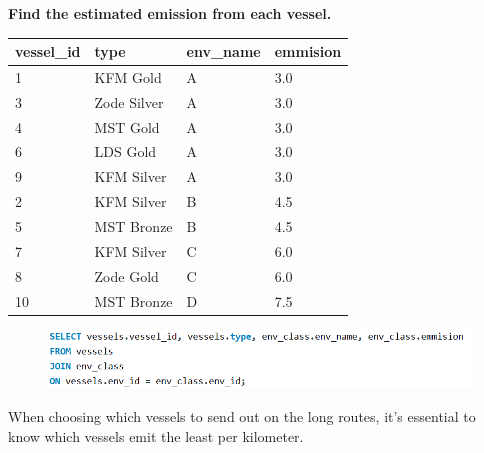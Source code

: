 \documentclass[a4paper]{article}
\begin{document}
\begin{flushleft}
{\bf Find the estimated emission from each vessel.} 
\begin{table}[!ht]
    \flushleft
    \begin{tabular}{|l|l|l|l|}
    \hline
        vessel\_id & type & env\_name & emmision \\ \hline
        1 & KFM Gold & A & 3.0 \\ \hline
        3 & Zode Silver & A & 3.0 \\ \hline
        4 & MST Gold & A & 3.0 \\ \hline
        6 & LDS Gold & A & 3.0 \\ \hline
        9 & KFM Silver & A & 3.0 \\ \hline
        2 & KFM Silver & B & 4.5 \\ \hline
        5 & MST Bronze & B & 4.5 \\ \hline
        7 & KFM Silver & C & 6.0 \\ \hline
        8 & Zode Gold & C & 6.0 \\ \hline
        10 & MST Bronze & D & 7.5 \\ \hline
    \end{tabular}
    \end{table}
    \begin{figure} [H]
        \flushleft
        \includegraphics[width=1\linewidth]{code/SQLestimatedEmmision.PNG}
        \label{fig:SQLestimatedEmmision}
    \end{figure}
    When choosing which vessels to send out on the long routes, it's essential to know which vessels emit the least per kilometer.
\end{flushleft}
\newpage
\end{document}

